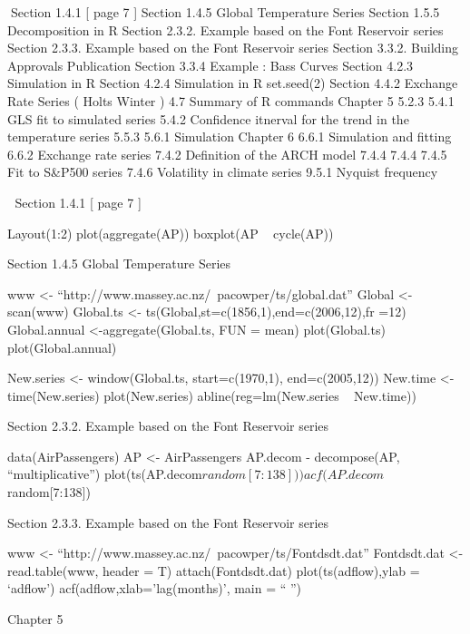 
Section 1.4.1 [ page 7 ]
Section 1.4.5 Global Temperature Series
Section 1.5.5 Decomposition in R
Section 2.3.2. Example based on the Font Reservoir series
Section 2.3.3. Example based on the Font Reservoir series
Section 3.3.2. Building Approvals Publication
Section 3.3.4 Example : Bass Curves
Section 4.2.3 Simulation in R
Section 4.2.4 Simulation in R
set.seed(2)
Section 4.4.2 Exchange Rate Series ( Holts Winter )
4.7 Summary of R commands
Chapter 5
5.2.3
5.4.1 GLS fit to simulated series
5.4.2 Confidence itnerval for the trend in the temperature series
5.5.3
5.6.1 Simulation
Chapter 6
6.6.1 Simulation and fitting
6.6.2 Exchange rate series
7.4.2 Definition of the ARCH model
7.4.4
7.4.4
7.4.5 Fit to S&P500 series
7.4.6 Volatility in climate series
9.5.1  Nyquist frequency


Section 1.4.1 [ page 7 ]

Layout(1:2)
plot(aggregate(AP))
boxplot(AP ~ cycle(AP))

Section 1.4.5 Global Temperature Series

www <- “http://www.massey.ac.nz/~pacowper/ts/global.dat”
Global <-scan(www)
Global.ts <- ts(Global,st=c(1856,1),end=c(2006,12),fr =12)
Global.annual <-aggregate(Global.ts, FUN = mean)
plot(Global.ts)
plot(Global.annual)


New.series <- window(Global.ts, start=c(1970,1), end=c(2005,12))
New.time <- time(New.series)
plot(New.series)
abline(reg=lm(New.series ~ New.time))





Section 2.3.2. Example based on the Font Reservoir series

data(AirPassengers)
AP <- AirPassengers
AP.decom - decompose(AP, “multiplicative”)
plot(ts(AP.decom$random[7:138]))
acf(AP.decom$random[7:138])



Section 2.3.3. Example based on the Font Reservoir series

www <- “http://www.massey.ac.nz/~pacowper/ts/Fontdsdt.dat”
Fontdsdt.dat <- read.table(www, header = T)
attach(Fontdsdt.dat)
plot(ts(adflow),ylab = ‘adflow’)
acf(adflow,xlab=’lag(months)’, main = “ ”)













Chapter 5









































